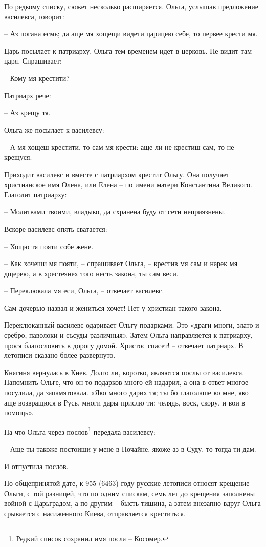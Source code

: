 По редкому списку, сюжет несколько расширяется. Ольга, услышав предложение василевса, говорит:

 – Аз погана есмь; да аще мя хощещи видети царицею себе, то первее крести мя.

Царь посылает к патриарху, Ольга тем временем идет в церковь. Не видит там царя. Спрашивает:

 – Кому мя крестити?

Патриарх рече:

 – Аз крещу тя.

Ольга же посылает к василевсу:

 – А мя хощеш крестити, то сам мя крести: аще ли не крестиш сам, то не крещуся.

Приходит василевс и вместе с патриархом крестит Ольгу. Она получает христианское имя Олена, или Елена – по имени матери Константина Великого. Глаголит патриарху:

 – Молитвами твоими, владыко, да схранена буду от сети неприязнены.

Вскоре василевс опять сватается:

 – Хощю тя пояти собе жене.

 – Как хочеши мя пояти, – спрашивает Ольга, – крестив мя сам и нарек мя дщерею, а в хрестеянех того несть закона, ты сам веси.

 – Переклюкала мя еси, Ольга, – отвечает василевс. 

Сам дочерью назвал и жениться хочет! Нет у христиан такого закона.

Переклюканный василевс одаривает Ольгу подарками. Это «драги многи, злато и сребро, паволоки и съсуды различныя». Затем Ольга направляется к патриарху, прося благословить в дорогу домой. Христос спасет! – отвечает патриарх. В летописи сказано более развернуто.

Княгиня вернулась в Киев. Долго ли, коротко, являются послы от василевса. Напомнить Ольге, что он-то подарков много ей надарил, а она в ответ многое посулила, да запамятовала. «Яко много дарих тя; ты бо глаголаше ко мне, яко аще возвращюся в Русь, многи дары прислю ти: челядь, воск, скору, и вои в помощь».

На что Ольга через послов\footnote{Редкий список сохранил имя посла – Косомер.} передала василевсу:

 – Аще ты такоже постоиши у мене в Почайне, якоже аз в Суду, то тогда ти дам.

И отпустила послов.

По общепринятой дате, к 955 (6463) году русские летописи относят крещение Ольги, с той разницей, что по одним спискам, семь лет до крещения заполнены войной с Царьградом, а по другим – бысть тишина, а затем внезапно вдруг Ольга срывается с насиженного Киева, отправляется креститься.

